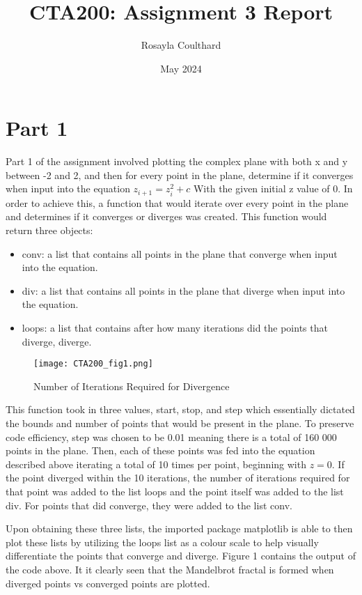 \documentclass{article}
\title{CTA200: Assignment 3 Report}
\author{Rosayla Coulthard}
\date{May 2024}
\begin{document}
\maketitle

\section{Part 1}
Part 1 of the assignment involved plotting the complex plane  with both x and y between -2 and 2, and then for every point in the plane, determine if it converges when input into the equation $z_{i + 1} = z_i^2 + c$
With the given initial z value of 0. In order to achieve this, a function that would iterate over every point in the plane and determines if it converges or diverges was created. This function would return three objects:
\begin{itemize}
    \item conv: a list that contains all points in the plane that converge when input into the equation.
    \item div: a list that contains all points in the plane that diverge when input into the equation.
    \item loops: a list that contains after how many iterations did the points that diverge, diverge.
\end{itemize}

\begin{wrapfigure}{r}{0.5\textwidth}
  \centering
  \texttt{[image: CTA200\_fig1.png]}
  \caption{Number of Iterations Required for Divergence}
\end{wrapfigure}

This function took in three values, start, stop, and step which essentially dictated the bounds and number of points that would be present in the plane. 
To preserve code efficiency, step was chosen to be 0.01 meaning there is a total of 160 000 points in the plane. Then, each of these points was fed into the equation described above iterating a total of 10 times per point, beginning with $z=0$. If the point diverged within the 10 iterations, the number of iterations required for that point was added to the list loops and the point itself was added to the list div. For points that did converge, they were added to the list conv.

Upon obtaining these three lists, the imported package matplotlib is able to then plot these lists by utilizing the loops list as a colour scale to  help visually differentiate the points that converge and diverge. 
Figure 1 contains the output of the code above. It it clearly seen that the Mandelbrot fractal is formed when diverged points vs converged points are plotted.
\end{document}

